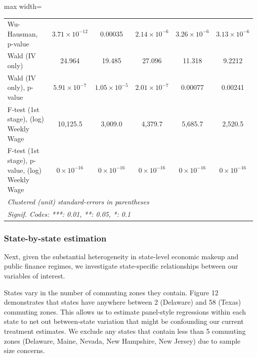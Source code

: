 \documentclass[
  10pt,
]{article}
\begin{document}
\begin{table}[htbp]
\begin{adjustbox}{max width=\textwidth}
\begin{tabular}{lccccc}
         Wu-Hausman, p-value                            & $3.71\times 10^{-12}$  & 0.00035               & $2.14\times 10^{-6}$  & $3.26\times 10^{-6}$  & $3.13\times 10^{-6}$\\   
         Wald (IV only)                                 & 24.964                 & 19.485                & 27.096                & 11.318                & 9.2212\\  
         Wald (IV only), p-value                        & $5.91\times 10^{-7}$   & $1.05\times 10^{-5}$  & $2.01\times 10^{-7}$  & 0.00077               & 0.00241\\  
         F-test (1st stage), (log) Weekly Wage          & 10,125.5               & 3,009.0               & 4,379.7               & 5,685.7               & 2,520.5\\  
         F-test (1st stage), p-value, (log) Weekly Wage & $0\times 10^{-16}$     & $0\times 10^{-16}$    & $0\times 10^{-16}$    & $0\times 10^{-16}$    & $0\times 10^{-16}$\\   
         \midrule \midrule
         \multicolumn{6}{l}{\emph{Clustered (unit) standard-errors in parentheses}}\\
         \multicolumn{6}{l}{\emph{Signif. Codes: ***: 0.01, **: 0.05, *: 0.1}}\\
      \end{tabular}
   \end{adjustbox}
\end{table}

\FloatBarrier

\subsubsection{State-by-state
estimation}\label{state-by-state-estimation}

Next, given the substantial heterogeneity in state-level economic makeup
and public finance regimes, we investigate state-specific relationships
between our variables of interest.

States vary in the number of commuting zones they contain. Figure 12
demonstrates that states have anywhere between 2 (Delaware) and 58
(Texas) commuting zones. This allows us to estimate panel-style
regressions within each state to net out between-state variation that
might be confounding our current treatment estimates. We exclude any
states that contain less than 5 commuting zones (Delaware, Maine,
Nevada, New Hampshire, New Jersey) due to sample size concerns.
\end{document}
